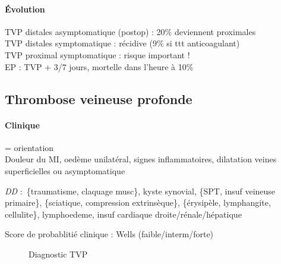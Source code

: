 \documentclass{article}
\begin{document}
\paragraph{Évolution}
TVP distales asymptomatique (postop) : 20\% deviennent proximales\\
TVP distales symptomatique : récidive (9\% si ttt anticoagulant)\\
TVP proximal symptomatique : risque important !\\
EP : TVP + 3/7 jours, mortelle dans l'heure à 10\%

\subsection{Thrombose veineuse profonde}

\paragraph{Clinique} = orientation\\
Douleur du MI, oedème unilatéral, signes inflammatoires, dilatation veines
superficielles ou asymptomatique

\textit{DD}  : \{traumatisme, claquage musc\}, kyste synovial, \{SPT, insuf veineuse
primaire\}, \{sciatique, compression extrinsèque\}, \{érysipèle, lymphangite,
cellulite\}, lymphoedeme, insuf cardiaque droite/rénale/hépatique

Score de probablitié clinique : Wells (faible/interm/forte)

\begin{figure}[htpb]
  \centering
  \caption{Diagnostic TVP}
\end{figure}
\end{document}
